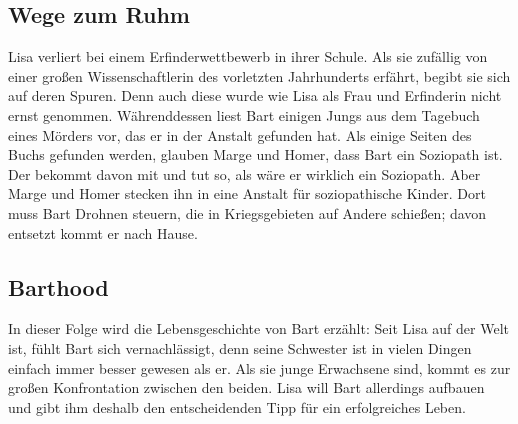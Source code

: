 
\subsection{Wege zum Ruhm}
Lisa verliert bei einem Erfinderwettbewerb in ihrer Schule. Als sie zufällig von einer großen Wissenschaftlerin des vorletzten Jahrhunderts erfährt, begibt sie sich auf deren Spuren. Denn auch diese wurde wie Lisa als Frau und Erfinderin nicht ernst genommen. Währenddessen liest Bart einigen Jungs aus dem Tagebuch eines Mörders vor, das er in der Anstalt gefunden hat. Als einige Seiten des Buchs gefunden werden, glauben Marge und Homer, dass Bart ein Soziopath ist. Der bekommt davon mit und tut so, als wäre er wirklich ein Soziopath. Aber Marge und Homer stecken ihn in eine Anstalt für soziopathische Kinder. Dort muss Bart Drohnen steuern, die in Kriegsgebieten auf Andere schießen; davon entsetzt kommt er nach Hause.


\subsection{Barthood}\label{VABF02}
In dieser Folge wird die Lebensgeschichte von Bart erzählt: Seit Lisa auf der Welt ist, fühlt Bart sich vernachlässigt, denn seine Schwester ist in vielen Dingen einfach immer besser gewesen als er. Als sie junge Erwachsene sind, kommt es zur großen Konfrontation zwischen den beiden. Lisa will Bart allerdings aufbauen und gibt ihm deshalb den entscheidenden Tipp für ein erfolgreiches Leben.

